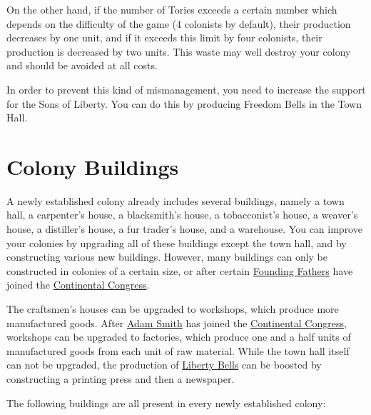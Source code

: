 \documentclass[12pt]{book}
\begin{document}
On the other hand, if the number of Tories exceeds a certain number
which depends on the difficulty of the game (4 colonists by default),
their production decreases by one unit, and if it exceeds this limit
by four colonists, their production is decreased by two units. This
waste may well destroy your colony and should be avoided at all
costs.

In order to prevent this kind of mismanagement, you need to increase
the support for the Sons of Liberty. You can do this by producing
Freedom Bells in the Town Hall.


\hypertarget{Colony Buildings}{\section{Colony Buildings}}

A newly established colony already includes several buildings, namely
a town hall, a carpenter's house, a blacksmith's house, a
tobacconist's house, a weaver's house, a distiller's house, a fur
trader's house, and a warehouse. You can improve your colonies by
upgrading all of these buildings except the town hall, and by
constructing various new buildings. However, many buildings can only
be constructed in colonies of a certain size, or after certain
\hyperlink{Founding Fathers}{Founding Fathers} have joined the
\hyperlink{Continental Congress}{Continental Congress}.

The craftsmen's houses can be upgraded to workshops, which produce
more manufactured goods. After \hyperlink{Adam Smith}{Adam Smith} has
joined the \hyperlink{Continental Congress}{Continental Congress},
workshops can be upgraded to factories, which produce one and a half
units of manufactured goods from each unit of raw material. While the
town hall itself can not be upgraded, the production of
\hyperlink{Liberty Bells}{Liberty Bells} can be boosted by
constructing a printing press and then a newspaper.

The following buildings are all present in every newly established
colony:
\end{document}
